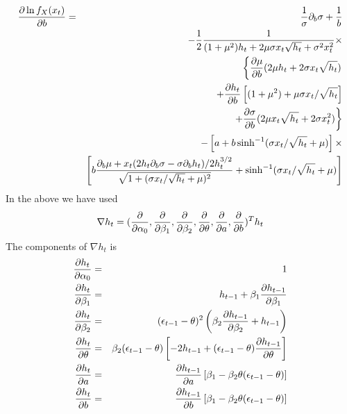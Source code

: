 \documentclass{book}
\begin{document}
\begin{eqnarray*}
  {\partial \ln f_X(x_t)\over \partial b} &=&
  {1 \over \sigma}\partial_b \sigma + {1 \over b} \\
  && -{1 \over 2} { 1
    \over
    (1 + \mu^2)h_t  +2\mu\sigma x_t \sqrt{h_t} + \sigma^2 x_t^2
  } \times \\
  && \left\{
    {\partial \mu \over \partial b}(2\mu h_t + 2\sigma x_t \sqrt{h_t}) \right.\\
  && + {\partial h_t \over \partial b} \left[
    (1 + \mu^2) + \mu\sigma x_t / \sqrt{h_t}
  \right] \\
  && \left.
    + {\partial \sigma \over \partial b}
    (2\mu x_t \sqrt{h_t} + 2\sigma x_t^2)
  \right\} \\
  && -\left[
    a + b\sinh^{-1}(\sigma x_t / \sqrt{h_t} + \mu)
  \right] \times \\
  && \left[
    b {\partial_b \mu + x_t
      (2h_t\partial_b\sigma - \sigma\partial_bh_t) / 2h_t^{3/2}
      \over
      \sqrt{1 + (\sigma x_t / \sqrt{h_t} + \mu)^2}
    } + \sinh^{-1}(\sigma x_t / \sqrt{h_t} + \mu)
  \right]
\end{eqnarray*}
In the above we have used
\[
\nabla h_t = (\frac{\partial}{\partial \alpha_0}, \frac{\partial}{\partial \beta_1},
\frac{\partial}{\partial \beta_2}, \frac{\partial}{\partial \theta}, \frac{\partial}{\partial a}, \frac{\partial}{\partial b})^T h_t
\]
The components of $\nabla h_t$ is
\begin{eqnarray*}
  \frac{\partial h_t}{\partial \alpha_0} &=& 1 \\
  \frac{\partial h_t}{\partial \beta_1} &=& h_{t-1} + \beta_1 \frac{\partial h_{t-1}}{\partial \beta_1}\\
  \frac{\partial h_t}{\partial \beta_2} &=& (\epsilon_{t-1} - \theta)^2 \left(
    \beta_2 \frac{\partial h_{t-1}}{\partial \beta_2} + h_{t-1} \right) \\
  \frac{\partial h_t}{\partial \theta} &=& \beta_2 (\epsilon_{t-1} - \theta)\left[
    -2 h_{t-1} + (\epsilon_{t-1} - \theta) \frac{\partial h_{t-1}}{\partial \theta}
  \right]\\
  \frac{\partial h_t}{\partial a} &=& \frac{\partial h_{t-1}}{\partial a} \left[
    \beta_1 - \beta_2 \theta (\epsilon_{t-1} - \theta)
  \right] \\
  \frac{\partial h_t}{\partial b} &=& \frac{\partial h_{t-1}}{\partial b} \left[
    \beta_1 - \beta_2 \theta (\epsilon_{t-1} - \theta)
  \right] \\
\end{eqnarray*}
\end{document}
